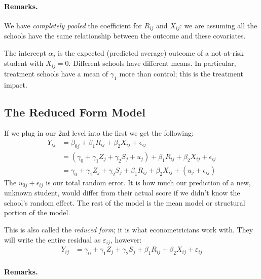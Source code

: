 \documentclass[
  letterpaper,
  DIV=11,
  numbers=noendperiod]{scrreprt}
\let\oldparagraph\paragraph
\renewcommand{\paragraph}[1]{\oldparagraph{#1}\mbox{}}
\begin{document}
\hypertarget{remarks.}{%
\paragraph{Remarks.}\label{remarks.}}

We have \emph{completely pooled} the coefficient for \(R_{ij}\) and
\(X_{ij}\): we are assuming all the schools have the same relationship
between the outcome and these covariates.

The intercept \(\alpha_{j}\) is the expected (predicted average) outcome
of a not-at-risk student with \(X_{ij} = 0\). Different schools have
different means. In particular, treatment schools have a mean of
\(\gamma_1\) more than control; this is the treatment impact.

\hypertarget{the-reduced-form-model}{%
\subsection{The Reduced Form Model}\label{the-reduced-form-model}}

If we plug in our 2nd level into the first we get the following:
\[\begin{aligned}
Y_{ij} &= \beta_{0j} + \beta_{1} R_{ij} + \beta_{2} X_{ij} + \epsilon_{ij} \\
&= (\gamma_{0} + \gamma_{1} Z_{j} + \gamma_{2} S_{j} + u_{j}) + \beta_1 R_{ij} + \beta_{2} X_{ij} + \epsilon_{ij} \\
&= \gamma_{0} + \gamma_{1} Z_{j} + \gamma_{2} S_{j} + \beta_{1} R_{ij} + \beta_{2} X_{ij} + (u_{j} + \epsilon_{ij})
\end{aligned}\] The \(u_{0j} + \epsilon_{ij}\) is our total random
error. It is how much our prediction of a new, unknown student, would
differ from their actual score if we didn't know the school's random
effect. The rest of the model is the mean model or structural portion of
the model.

This is also called the \emph{reduced form}; it is what econometricians
work with. They will write the entire residual as \(\varepsilon_{ij}\),
however: \[\begin{aligned}
Y_{ij} &= \gamma_{0} + \gamma_{1} Z_{j} + \gamma_{2} S_{j} + \beta_{1} R_{ij} + \beta_{2} X_{ij} + \varepsilon_{ij}
\end{aligned}\]

\hypertarget{remarks.-1}{%
\paragraph{Remarks.}\label{remarks.-1}}
\end{document}
